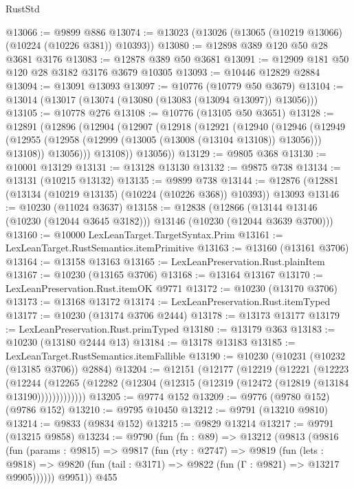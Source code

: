 \begin{lexlean}{RustStd}
\begin{coremodule}
@13066 := @9899 @886
@13074 := @13023 (@13026 (@13065 (@10219 @13066) (@10224 (@10226 @381)) @10393))
@13080 := @12898 @389 @120 @50 @28 @3681 @3176
@13083 := @12878 @389 @50 @3681
@13091 := @12909 @181 @50 @120 @28 @3182 @3176 @3679 @10305
@13093 := @10446 @12829 @2884
@13094 := @13091 @13093
@13097 := @10776 (@10779 @50 @3679)
@13104 := @13014 (@13017 (@13074 (@13080 (@13083 (@13094 @13097)) @13056)))
@13105 := @10778 @276
@13108 := @10776 (@13105 @50 @3651)
@13128 := @12891
    (@12896
      (@12904
        (@12907
          (@12918
            (@12921
              (@12940
                (@12946
                  (@12949
                    (@12955 (@12958 (@12999 (@13005 (@13008 (@13104 @13108)) @13056))) @13108))
                  @13056)))
            @13108))
        @13056))
@13129 := @9805 @368
@13130 := @10001 @13129
@13131 := @13128 @13130
@13132 := @9875 @738
@13134 := @13131 (@10215 @13132)
@13135 := @9899 @738
@13144 := @12876 (@12881 (@13134 (@10219 @13135) (@10224 (@10226 @368)) @10393)) @13093
@13146 := @10230 (@11024 @3637)
@13158 := @12838
    (@12866 (@13144 @13146 (@10230 (@12044 @3645 @3182))) @13146 (@10230 (@12044 @3639 @3700)))
@13160 := @10000 LexLeanTarget.TargetSyntax.Prim
@13161 := LexLeanTarget.RustSemantics.itemPrimitive
@13163 := @13160 (@13161 @3706)
@13164 := @13158 @13163
@13165 := LexLeanPreservation.Rust.plainItem
@13167 := @10230 (@13165 @3706)
@13168 := @13164 @13167
@13170 := LexLeanPreservation.Rust.itemOK @9771
@13172 := @10230 (@13170 @3706)
@13173 := @13168 @13172
@13174 := LexLeanPreservation.Rust.itemTyped
@13177 := @10230 (@13174 @3706 @2444)
@13178 := @13173 @13177
@13179 := LexLeanPreservation.Rust.primTyped
@13180 := @13179 @363
@13183 := @10230 (@13180 @2444 @13)
@13184 := @13178 @13183
@13185 := LexLeanTarget.RustSemantics.itemFallible
@13190 := @10230 (@10231 (@10232 (@13185 @3706)) @2884)
@13204 := @12151
    (@12177
      (@12219
        (@12221
          (@12223
            (@12244
              (@12265 (@12282 (@12304 (@12315 (@12319 (@12472 (@12819 (@13184 @13190)))))))))))))
@13205 := @9774 @152
@13209 := @9776 (@9780 @152) (@9786 @152)
@13210 := @9795 @10450
@13212 := @9791 (@13210 @9810)
@13214 := @9833 (@9834 @152)
@13215 := @9829 @13214
@13217 := @9791 (@13215 @9858)
@13234 := @9790
    (fun (fn : @89) =>
    @13212
      (@9813
        (@9816
          (fun (params : @9815) =>
          @9817
            (fun (rty : @2747) =>
            @9819
              (fun (lets : @9818) =>
              @9820 (fun (tail : @3171) => @9822 (fun (Γ : @9821) => @13217 @9905))))))
        @9951))
    @455

\end{coremodule}
\end{lexlean}
